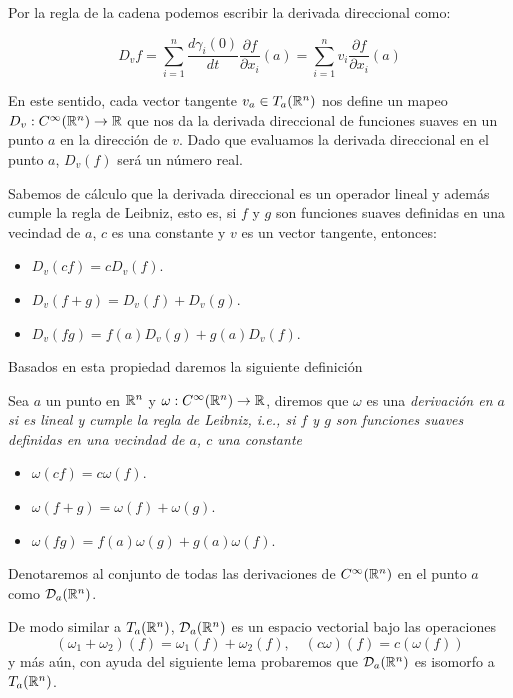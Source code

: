 Por la regla de la cadena podemos escribir la derivada direccional como:

\[D_v f = \sum_{i=1}^{n} \frac{d \gamma_i(0)}{dt} \frac{\partial f}{\partial x_i} (a)
	=\sum_{i=1}^n v_i \frac{\partial f}{\partial x_i} (a) \]

En este sentido, cada vector tangente $v_a \in T_a(\mathbb{R}^n)$ nos define un mapeo $D_v: C^{\infty}(\mathbb{R}^n) \to \mathbb{R}$ que nos da la derivada direccional de funciones suaves en un punto $a$ en la dirección de $v$. Dado que evaluamos la derivada direccional en el punto $a$, $D_v(f)$ será un número real.

Sabemos de cálculo que la derivada direccional es un operador lineal y además cumple la regla de Leibniz, esto es, si $f$ y $g$ son funciones suaves definidas en una vecindad de $a$, $c$ es una constante y $v$ es un vector tangente, entonces:

\begin{itemize}
	\item $D_v(cf) = c D_v(f)$.
	\item $D_v(f+g) = D_v(f) + D_v(g)$.
	\item $D_v(fg) = f(a) D_v(g) + g(a) D_v(f)$.
\end{itemize}

Basados en esta propiedad daremos la siguiente definición

\begin{definition}\label{Definición: Derivación en un punto de Rn}
	Sea $a$ un punto en $\mathbb{R}^n$ y $\omega: C^{\infty}(\mathbb{R}^n) \to \mathbb{R}$, diremos que $\omega$ es una \it{derivación en $a$} si es lineal y cumple la regla de Leibniz, i.e., si $f$ y $g$ son funciones suaves definidas en una vecindad de $a$, $c$ una constante

	\begin{itemize}
		\item $\omega(cf) = c \omega(f)$.
		\item $\omega(f+g) = \omega(f) + \omega(g)$.
		\item $\omega(fg) = f(a) \omega(g) + g(a) \omega(f)$.
	\end{itemize}

	Denotaremos al conjunto de todas las derivaciones de $C^{\infty}(\mathbb{R}^n)$ en el punto $a$ como $\mathcal{D}_a(\mathbb{R}^n)$.
\end{definition}

De modo similar a $T_a(\mathbb{R}^n)$, $\mathcal{D}_a(\mathbb{R}^n)$ es un espacio vectorial bajo las operaciones
\[ (\omega_1 + \omega_2)(f) = \omega_1(f) + \omega_2(f), \quad (c\omega)(f) = c(\omega(f)) \]
y más aún, con ayuda del siguiente lema probaremos que $\mathcal{D}_a(\mathbb{R}^n)$ es isomorfo a $T_a(\mathbb{R}^n)$.

